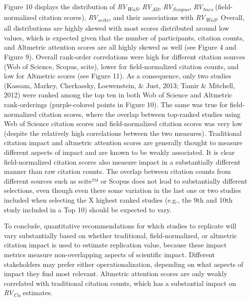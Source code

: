 \documentclass[
  man,floatsintext]{apa6}
\begin{document}
Figure 10 displays the distribution of \emph{RV\textsubscript{WoS}}, \emph{RV\textsubscript{Alt}}, \emph{RV\textsubscript{Scopus}}, \emph{RV\textsubscript{tncs}} (field-normalized citation scores), \emph{RV\textsubscript{scite}}, and their associations with \emph{RV\textsubscript{WoS}}. Overall, all distributions are highly skewed with most scores distributed around low values, which is expected given that the number of participants, citation counts, and Altmetric attention scores are all highly skewed as well (see Figure 4 and Figure 9). Overall rank-order correlations were high for different citation sources (Wob of Science, Scopus, scite), lower for field-normalized citation counts, and low for Altmetric scores (see Figure 11). As a consequence, only two studies (Kassam, Markey, Cherkassky, Loewenstein, \& Just, 2013; Tamir \& Mitchell, 2012) were ranked among the top ten in both Wob of Science and Altmetric rank-orderings (purple-colored points in Figure 10). The same was true for field-normalized citation scores, where the overlap between top-ranked studies using Web of Science citation scores and field-normalized citation scores was very low (despite the relatively high correlations between the two measures). Traditional citation impact and altmetric attention scores are generally thought to measure different aspects of impact and are known to be weakly associated. It is clear field-normalized citation scores also measure impact in a substantially different manner than raw citation counts. The overlap between citation counts from different sources such as scite™ or Scopus does not lead to substantially different selections, even though even there some variation in the last one or two studies included when selecting the X highest ranked studies (e.g., the 9th and 10th study included in a Top 10) should be expected to vary.

To conclude, quantitative recommendations for which studies to replicate will vary substantially based on whether traditional, field-normalized, or altmetric citation impact is used to estimate replication value, because these impact metrics measure non-overlapping aspects of scientific impact. Different stakeholders may prefer either operationalization, depending on what aspects of impact they find most relevant. Altmetric attention scores are only weakly correlated with traditional citation counts, which has a substantial impact on \emph{RV\textsubscript{Cn}} estimates.
\end{document}
